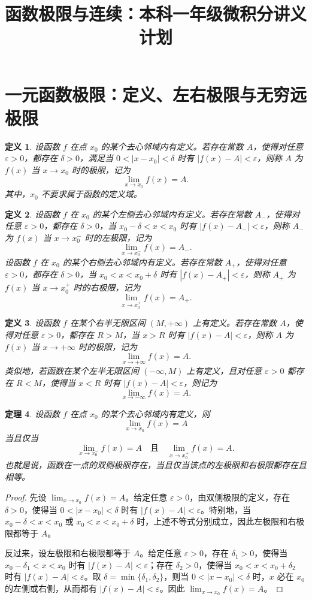 \documentclass[UTF8,fontset=fandol,11pt]{ctexart}
\title{函数极限与连续：本科一年级微积分讲义计划}
\date{}
\newtheorem{definition}{定义}[section]
\newtheorem{theorem}[definition]{定理}
\begin{document}
\maketitle
\section{一元函数极限：定义、左右极限与无穷远极限}\label{sec:S01}
\begin{definition}
设函数 $f$ 在点 $x_0$ 的某个去心邻域内有定义。若存在常数 $A$，使得对任意 $\varepsilon>0$，都存在 $\delta>0$，满足当 $0<|x-x_0|<\delta$ 时有 $|f(x)-A|<\varepsilon$，则称 $A$ 为 $f(x)$ 当 $x\to x_0$ 时的极限，记为
\[
\lim_{x\to x_0}f(x)=A.
\]
其中，$x_0$ 不要求属于函数的定义域。\label{def:point-limit}
\end{definition}
\begin{definition}
设函数 $f$ 在 $x_0$ 的某个左侧去心邻域内有定义。若存在常数 $A_-$，使得对任意 $\varepsilon>0$，都存在 $\delta>0$，当 $x_0-\delta<x<x_0$ 时有 $|f(x)-A_-|<\varepsilon$，则称 $A_-$ 为 $f(x)$ 当 $x\to x_0^-$ 时的左极限，记为
\[
\lim_{x\to x_0^-}f(x)=A_-.
\]
设函数 $f$ 在 $x_0$ 的某个右侧去心邻域内有定义。若存在常数 $A_+$，使得对任意 $\varepsilon>0$，都存在 $\delta>0$，当 $x_0<x<x_0+\delta$ 时有 $|f(x)-A_+|<\varepsilon$，则称 $A_+$ 为 $f(x)$ 当 $x\to x_0^+$ 时的右极限，记为
\[
\lim_{x\to x_0^+}f(x)=A_+.
\]
\label{def:one-sided-limit}
\end{definition}
\begin{definition}
设函数 $f$ 在某个右半无限区间 $(M,+\infty)$ 上有定义。若存在常数 $A$，使得对任意 $\varepsilon>0$，都存在 $R>M$，当 $x>R$ 时有 $|f(x)-A|<\varepsilon$，则称 $A$ 为 $f(x)$ 当 $x\to+\infty$ 时的极限，记为
\[
\lim_{x\to+\infty}f(x)=A.
\]
类似地，若函数在某个左半无限区间 $(-\infty,M)$ 上有定义，且对任意 $\varepsilon>0$ 都存在 $R<M$，使得当 $x<R$ 时有 $|f(x)-A|<\varepsilon$，则记为
\[
\lim_{x\to-\infty}f(x)=A.
\]
\label{def:infinite-limit}
\end{definition}
\begin{theorem}
设函数 $f$ 在点 $x_0$ 的某个去心邻域内有定义，则
\[
\lim_{x\to x_0}f(x)=A
\]
当且仅当
\[
\lim_{x\to x_0^-}f(x)=A
\quad\text{且}\quad
\lim_{x\to x_0^+}f(x)=A.
\]
也就是说，函数在一点的双侧极限存在，当且仅当该点的左极限和右极限都存在且相等。\label{thm:two-sided-limit-criterion}
\end{theorem}
\begin{proof}
先设 $\lim_{x\to x_0}f(x)=A$。给定任意 $\varepsilon>0$，由双侧极限的定义，存在 $\delta>0$，使得当 $0<|x-x_0|<\delta$ 时有 $|f(x)-A|<\varepsilon$。特别地，当 $x_0-\delta<x<x_0$ 或 $x_0<x<x_0+\delta$ 时，上述不等式分别成立，因此左极限和右极限都等于 $A$。

反过来，设左极限和右极限都等于 $A$。给定任意 $\varepsilon>0$，存在 $\delta_1>0$，使得当 $x_0-\delta_1<x<x_0$ 时有 $|f(x)-A|<\varepsilon$；存在 $\delta_2>0$，使得当 $x_0<x<x_0+\delta_2$ 时有 $|f(x)-A|<\varepsilon$。取 $\delta=\min\{\delta_1,\delta_2\}$，则当 $0<|x-x_0|<\delta$ 时，$x$ 必在 $x_0$ 的左侧或右侧，从而都有 $|f(x)-A|<\varepsilon$。因此 $\lim_{x\to x_0}f(x)=A$。
\end{proof}
\end{document}

